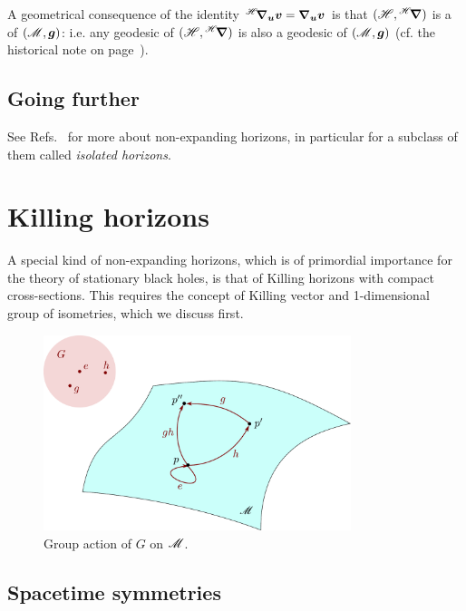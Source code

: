 {{A geometrical consequence of the identity
${}^{\mathscr{H}}\!\bm{\nabla}_{\bm{u}}\bm{v} = \bm{\nabla}_{\bm{u}}\bm{v}$ is
that $(\mathscr{H}, {}^{\mathscr{H}}\!\bm{\nabla})$ is a  of $(\mathscr{M},\bm{g})$:
i.e. any geodesic of $(\mathscr{H}, {}^{\mathscr{H}}\!\bm{\nabla})$ is also a geodesic of $(\mathscr{M},\bm{g})$
(cf. the historical note on page~\pageref{h:def:NEH}).


\subsection{Going further}

See Refs.~\cite{AshteK04,GourgJ06,Jaram13} for more
about non-expanding horizons, in particular for a subclass of them
called \emph{isolated horizons}.



\section{Killing horizons}


A special kind of non-expanding horizons, which is of primordial
importance for the theory of
stationary black holes, is that of Killing horizons with compact cross-sections.
This requires the concept of Killing vector and 1-dimensional group of
isometries, which we discuss first.


\begin{figure}
\centerline{\includegraphics[width=0.8\textwidth]{def_group_action.pdf}}
\caption[]{\label{f:def:group_action} \footnotesize
Group action of $G$ on $\mathscr{M}$.}
\end{figure}


\subsection{Spacetime symmetries}

}}
